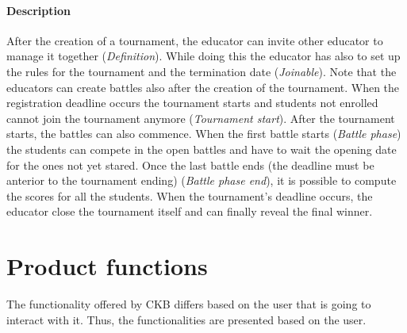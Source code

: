 \documentclass[12pt, a4paper]{report}
\begin{document}
    \paragraph*{Description}
    After the creation of a tournament, the educator can invite other educator to manage it together (\textit{Definition}). 
    While doing this the educator has also to set up the rules for the tournament and the termination date (\textit{Joinable}).
    Note that the educators can create battles also after the creation of the tournament.
    When the registration deadline occurs the tournament starts and students not enrolled cannot join the tournament anymore (\textit{Tournament start}). 
    After the tournament starts, the battles can also commence. 
    When the first battle starts (\textit{Battle phase}) the students can compete in the open battles and have to wait the opening date for the ones not yet stared. 
    Once the last battle ends (the deadline must be anterior to the tournament ending) (\textit{Battle phase end}), it is possible to compute the scores for all the students. 
    When the tournament's deadline occurs, the educator close the tournament itself and can finally reveal the final winner. 

    \section{Product functions}
    The functionality offered by CKB differs based on the user that is going to interact with it. 
    Thus, the functionalities are presented based on the user. 
    
\end{document}
